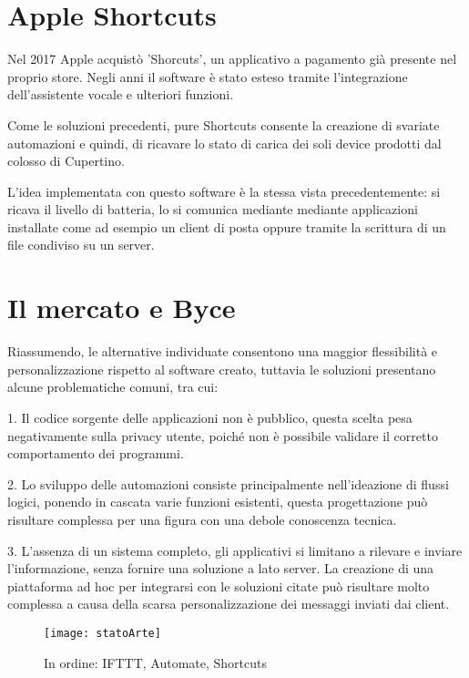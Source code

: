 \documentclass[target=bach]{thud}
\begin{document}
    \section{Apple Shortcuts}

    Nel 2017 Apple acquistò 'Shorcuts', un applicativo a pagamento già presente nel proprio store.
    Negli anni il software è stato esteso tramite l'integrazione dell'assistente vocale e ulteriori funzioni.

    Come le soluzioni precedenti, pure Shortcuts consente la creazione di svariate automazioni e quindi, di ricavare lo stato di carica dei soli device prodotti dal colosso di Cupertino.

    L'idea implementata con questo software è la stessa vista precedentemente: si ricava il livello di batteria, lo si comunica mediante mediante applicazioni installate come ad esempio un client di posta oppure tramite la scrittura di un file condiviso su un server.

    \section{Il mercato e Byce}

    Riassumendo, le alternative individuate consentono una maggior flessibilità e personalizzazione rispetto al software creato, tuttavia le soluzioni presentano alcune problematiche comuni, tra cui:

    1. Il codice sorgente delle applicazioni non è pubblico, questa scelta pesa negativamente sulla privacy utente, poiché non è possibile validare il corretto comportamento dei programmi.

    2. Lo sviluppo delle automazioni consiste principalmente nell'ideazione di flussi logici, ponendo in cascata varie funzioni esistenti, questa progettazione può risultare complessa per una figura con una debole conoscenza tecnica.

    3. L'assenza di un sistema completo, gli applicativi si limitano a rilevare e inviare l'informazione, senza fornire una soluzione a lato server. La creazione di una piattaforma ad hoc per integrarsi con le soluzioni citate può risultare molto complessa a causa della scarsa personalizzazione dei messaggi inviati dai client.


    \graphicspath{ {./img/} }
    \begin{figure}[h]
        \centering
        \texttt{[image: statoArte]}
        \caption{In ordine: IFTTT, Automate, Shortcuts}
        \label{fig:usecase}
    \end{figure}
\end{document}
